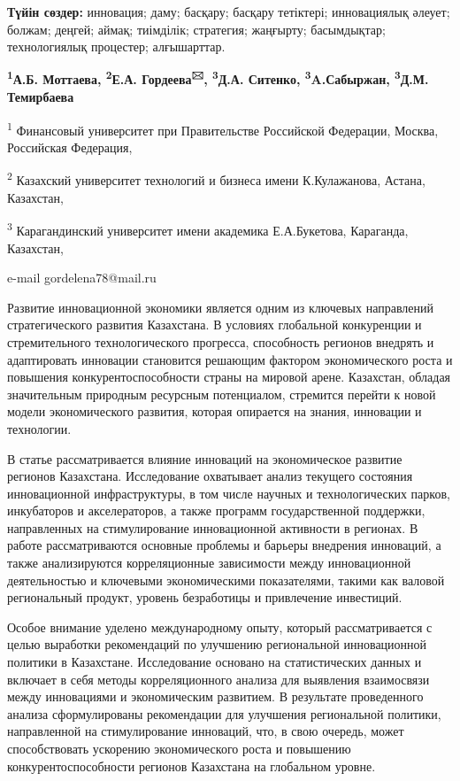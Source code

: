 {\bfseries Түйін сөздер:} инновация; даму; басқару; басқару тетіктері;
инновациялық әлеует; болжам; деңгей; аймақ; тиімділік; стратегия;
жаңғырту; басымдықтар; технологиялық процестер; алғышарттар.


\begin{center}
{\bfseries \textsuperscript{1}А.Б. Моттаева, \textsuperscript{2}Е.А.
Гордеева\textsuperscript{🖂}, \textsuperscript{3}Д.А. Ситенко,
\textsuperscript{3}A.Сабыржан, \textsuperscript{3}Д.М.}
{\bfseries Темирбаева}

\textsuperscript{1} Финансовый университет при Правительстве Российской
Федерации, Москва, Российская Федерация,

\textsuperscript{2} Казахский университет технологий и бизнеса имени
К.Кулажанова, Астана, Казахстан,

\textsuperscript{3} Карагандинский университет имени академика
Е.А.Букетова, Караганда, Казахстан,

e-mail gordelena78@mail.ru
\end{center}

Развитие инновационной экономики является одним из ключевых направлений
стратегического развития Казахстана. В условиях глобальной конкуренции и
стремительного технологического прогресса, способность регионов внедрять
и адаптировать инновации становится решающим фактором экономического
роста и повышения конкурентоспособности страны на мировой арене.
Казахстан, обладая значительным природным ресурсным потенциалом,
стремится перейти к новой модели экономического развития, которая
опирается на знания, инновации и технологии.

В статье рассматривается влияние инноваций на экономическое развитие
регионов Казахстана. Исследование охватывает анализ текущего состояния
инновационной инфраструктуры, в том числе научных и технологических
парков, инкубаторов и акселераторов, а также программ государственной
поддержки, направленных на стимулирование инновационной активности в
регионах. В работе рассматриваются основные проблемы и барьеры внедрения
инноваций, а также анализируются корреляционные зависимости между
инновационной деятельностью и ключевыми экономическими показателями,
такими как валовой региональный продукт, уровень безработицы и
привлечение инвестиций.

Особое внимание уделено международному опыту, который рассматривается с
целью выработки рекомендаций по улучшению региональной инновационной
политики в Казахстане. Исследование основано на статистических данных и
включает в себя методы корреляционного анализа для выявления взаимосвязи
между инновациями и экономическим развитием. В результате проведенного
анализа сформулированы рекомендации для улучшения региональной политики,
направленной на стимулирование инноваций, что, в свою очередь, может
способствовать ускорению экономического роста и повышению
конкурентоспособности регионов Казахстана на глобальном уровне.

